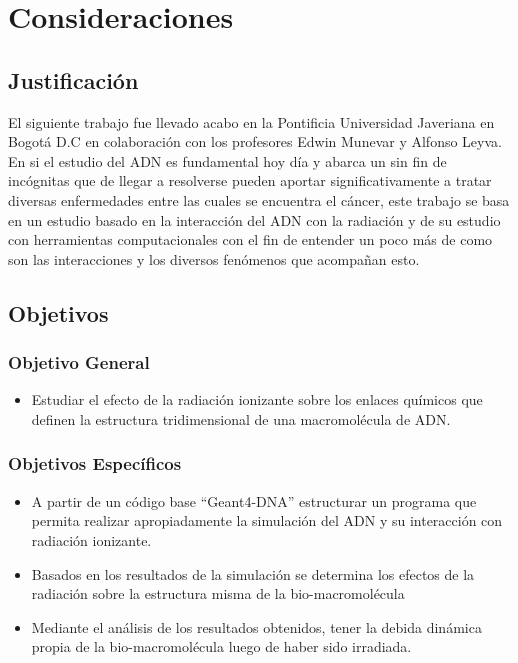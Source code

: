 \clearpage
\section{Consideraciones}

\subsection{Justificación}
\label{sec:Intro}
El siguiente trabajo fue llevado acabo en la Pontificia Universidad Javeriana en Bogotá D.C en colaboración con los profesores Edwin Munevar y Alfonso Leyva. En si el estudio del ADN es fundamental hoy día y abarca un sin fin de incógnitas que de llegar a resolverse pueden aportar significativamente a tratar diversas enfermedades entre las cuales se encuentra el cáncer, este trabajo se basa en un estudio basado en la interacción del ADN con la radiación y de su estudio con herramientas computacionales con el fin de entender un poco más de como son las interacciones y los diversos fenómenos que acompañan esto.
\subsection{Objetivos}
\subsubsection{Objetivo General}
\begin{itemize}
  \item Estudiar el efecto de la radiación ionizante sobre los enlaces químicos que definen la estructura tridimensional de una macromolécula de ADN.
\end{itemize}
\subsubsection{Objetivos Específicos}
\begin{itemize}
  \item A partir de un código base “Geant4-DNA” estructurar un programa que permita realizar apropiadamente la simulación del ADN y su interacción con radiación ionizante.
  \item Basados en los resultados de la simulación se determina los efectos de la radiación sobre la estructura misma de la bio-macromolécula
  \item Mediante el análisis de los resultados obtenidos, tener la debida dinámica propia de la bio-macromolécula luego de haber sido irradiada.
\end{itemize}
